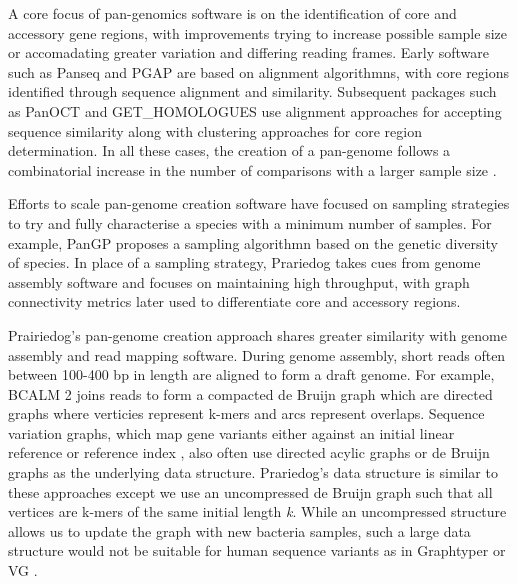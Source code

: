 \documentclass{article}
\begin{document}
A core focus of pan-genomics software is on the identification of core and accessory gene regions, with improvements trying to increase possible sample size or accomadating greater variation and differing reading frames.
Early software such as Panseq \cite{laing2010pan} and PGAP \cite{zhao2011pgap} are based on alignment algorithmns, with core regions identified through sequence alignment and similarity.
Subsequent packages such as PanOCT \cite{fouts2012panoct} and GET_HOMOLOGUES \cite{contreras2013get_homologues} use alignment approaches for accepting sequence similarity along with clustering approaches for core region determination.
In all these cases, the creation of a pan-genome follows a combinatorial increase in the number of comparisons with a larger sample size \cite{vernikos2015ten}.

Efforts to scale pan-genome creation software have focused on sampling strategies to try and fully characterise a species with a minimum number of samples.
For example, PanGP \cite{zhao2014pangp} proposes a sampling algorithmn based on the genetic diversity of species.
In place of a sampling strategy, Prariedog takes cues from genome assembly software and focuses on maintaining high throughput, with graph connectivity metrics later used to differentiate core and accessory regions.

Prairiedog's pan-genome creation approach shares greater similarity with genome assembly and read mapping software.
During genome assembly, short reads often between 100-400 bp in length are aligned to form a draft genome.
For example, BCALM 2 \cite{chikhi2016compacting} joins reads to form a compacted de Bruijn graph which are directed graphs where verticies represent k-mers and arcs represent overlaps.
Sequence variation graphs, which map gene variants either against an initial linear reference \cite{eggertsson2017graphtyper} or reference index \cite{garrison2018variation}, also often use directed acylic graphs or de Bruijn graphs as the underlying data structure.
Prariedog's data structure is similar to these approaches except we use an uncompressed de Bruijn graph such that all vertices are k-mers of the same initial length \textit{k}.
While an uncompressed structure allows us to update the graph with new bacteria samples, such a large data structure would not be suitable for human sequence variants as in Graphtyper \cite{eggertsson2017graphtyper} or VG \cite{garrison2018variation}.
\end{document}
